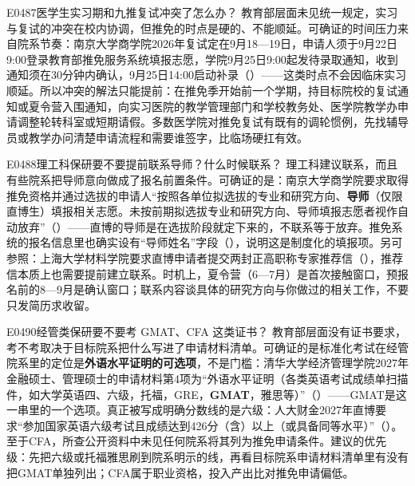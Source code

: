 \begin{qa}{E0487}{医学生实习期和九推复试冲突了怎么办？}
教育部层面未见统一规定，实习与复试的冲突在校内协调，但推免的时点是硬的、不能顺延。可确证的时间压力来自院系节奏：南京大学商学院2026年复试定在9月18—19日，申请人须于9月22日9:00登录教育部推免服务系统填报志愿，学院9月25日9:00起发待录取通知，收到通知须在30分钟内确认，9月25日14:00启动补录（）——这类时点不会因临床实习顺延。所以冲突的解法只能提前：在推免季开始前一个学期，持目标院校的复试通知或夏令营入围通知，向实习医院的教学管理部门和学校教务处、医学院教学办申请调整轮转科室或短期请假。多数医学院对推免复试有既有的调轮惯例，先找辅导员或教学办问清楚申请流程和需要谁签字，比临场硬扛有效。
\end{qa}

\begin{qa}{E0488}{理工科保研要不要提前联系导师？什么时候联系？}
理工科建议联系，而且有些院系把导师意向做成了报名前置条件。可确证的是：南京大学商学院要求取得推免资格并通过选拔的申请人“按照各单位拟选拔的专业和研究方向、\textbf{导师}（仅限直博生）填报相关志愿。未按前期拟选拔专业和研究方向、导师填报志愿者视作自动放弃”（）——直博的导师是在选拔阶段就定下来的，不联系等于放弃。推免系统的报名信息里也确实设有“导师姓名”字段（），说明这是制度化的填报项。另可参照：上海大学材料学院要求直博申请者提交两封正高职称专家推荐信（），推荐信本质上也需要提前建立联系。时机上，夏令营（6—7月）是首次接触窗口，预报名前的8—9月是确认窗口；联系内容谈具体的研究方向与你做过的相关工作，不要只发简历求收留。
\end{qa}

\begin{qa}{E0490}{经管类保研要不要考 GMAT、CFA 这类证书？}
教育部层面没有证书要求，考不考取决于目标院系把什么写进了申请材料清单。可确证的是标准化考试在经管院系里的定位是\textbf{外语水平证明的可选项}，不是门槛：清华大学经济管理学院2027年金融硕士、管理硕士的申请材料第4项为“外语水平证明（各类英语考试成绩单扫描件，如大学英语四、六级，托福，GRE，\textbf{GMAT}，雅思等）”（）——GMAT是这一串里的一个选项。真正被写成明确分数线的是六级：人大财金2027年直博要求“参加国家英语六级考试且成绩达到426分（含）以上（或具备同等水平）”（）。至于CFA，所查公开资料中未见任何院系将其列为推免申请条件。建议的优先级：先把六级或托福雅思刷到院系明示的线，再看目标院系申请材料清单里有没有把GMAT单独列出；CFA属于职业资格，投入产出比对推免申请偏低。
\end{qa}

